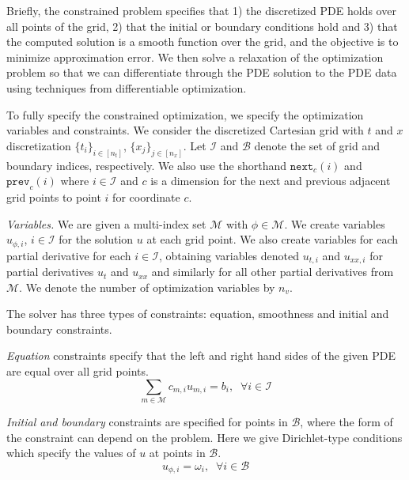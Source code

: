 Briefly, the constrained problem specifies that 1) the discretized PDE holds over all points of the grid, 2) that the initial or boundary conditions hold and 3) that the computed solution is a smooth function over the grid, and the objective is to minimize approximation error.
We then solve a relaxation of the optimization problem so that we can differentiate through the PDE solution to the PDE data using techniques from differentiable optimization. 

To fully specify the constrained optimization, we  specify the optimization variables and constraints.
We consider the discretized Cartesian grid with $t$ and $x$ discretization $\{t_i\}_{i\in [n_t]}$, $\{x_j\}_{j\in [n_x]}$.
Let $\mathcal{I}$ and $\mathcal{B}$ denote the set of grid and boundary indices, respectively. 
We also use the shorthand $\texttt{next}_{c}(i)$ and $\texttt{prev}_{c}(i)$ where $i\in\mathcal{I}$ and $c$ is a dimension for the next and previous adjacent grid points to point $i$ for coordinate $c$.

\emph{Variables.} We are given a multi-index set $\mathcal{M}$ with $\phi \in \mathcal{M}$.
We create variables $u_{\phi,i}$, $i\in\mathcal{I}$ for the solution $u$ at each grid point.
We also create variables for each partial derivative for each $i\in\mathcal{I}$, 
obtaining variables denoted $u_{t,i}$ and $u_{xx,i}$ for partial derivatives $u_t$ and $u_{xx}$ and similarly for all other partial derivatives from $\mathcal{M}$.
We denote the number of optimization variables by $n_v$.

The solver has three types of constraints: equation, smoothness and initial and boundary constraints.

\begingroup
\setlength\abovedisplayskip{1.5pt}
\setlength\belowdisplayskip{1.5pt}
\emph{Equation} constraints specify that the left and right hand sides of the given PDE are equal over all grid points.
\begin{equation}
\sum_{m\in\mathcal{M}}c_{m,i}u_{m,i} = b_i, \;\; \forall i \in \mathcal{I}
\end{equation}

\emph{Initial and boundary} constraints are specified for points in $\mathcal{B}$, where the form of the constraint can depend on the problem.
Here we give Dirichlet-type conditions which specify the values of $u$ at points in $\mathcal{B}$.
\begin{equation}
u_{\phi,i} = \omega_i, \;\; \forall i \in \mathcal{B}
\end{equation}

